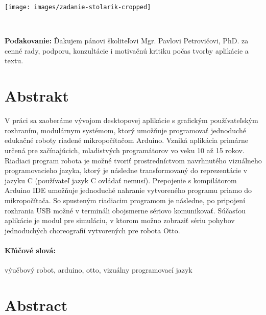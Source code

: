 \documentclass[12pt, twoside]{book}
\begin{document}
\newpage 
\thispagestyle{empty}
\hspace{-2cm}\texttt{[image: images/zadanie-stolarik-cropped]}


\frontmatter

\setcounter{page}{7}
\newpage 
~

\vfill
{\bf Poďakovanie:} Ďakujem pánovi školiteľovi Mgr. Pavlovi Petrovičovi, PhD. za cenné rady, podporu, konzultácie i motivačnú kritiku počas tvorby aplikácie a textu.


\newpage 
\section*{Abstrakt}
V práci sa zaoberáme vývojom desktopovej aplikácie s grafickým používateľským rozhraním, modulárnym systémom, ktorý umožňuje programovať jednoduché edukačné roboty riadené mikropočítačom Arduino. Vzniká aplikácia primárne určená pre začínajúcich, mladistvých programátorov vo veku 10 až 15 rokov. Riadiaci program robota je možné tvoriť prostredníctvom navrhnutého vizuálneho programovacieho jazyka, ktorý je následne transformovaný do reprezentácie v jazyku C (používateľ jazyk C ovládať nemusí). Prepojenie s kompilátorom Arduino IDE umožňuje jednoduché nahranie vytvoreného programu priamo do mikropočítača. So spusteným riadiacim programom je následne, po pripojení rozhrania USB možné v termináli obojsmerne sériovo komunikovať. Súčasťou aplikácie je modul pre simuláciu, v ktorom možno zobraziť sériu pohybov jednoduchých choreografií vytvorených pre robota Otto.

\paragraph*{Kľúčové slová:} výučbový robot, arduino, otto, vizuálny programovací jazyk


\newpage 
\section*{Abstract}
\end{document}
